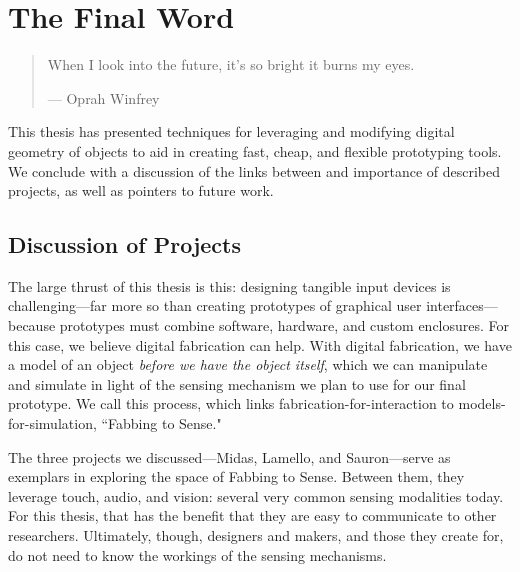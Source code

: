 \chapter{The Final Word}

\begin{quote}
When I look into the future, it's so bright it burns my eyes.

--- Oprah Winfrey
\end{quote}

This thesis has presented techniques for leveraging and modifying digital geometry of objects to aid in creating fast, cheap, and flexible prototyping tools. We conclude with a discussion of the links between and importance of described projects, as well as pointers to future work.



%

\section{Discussion of Projects}

The large thrust of this thesis is this: designing tangible input devices is challenging---far more so than creating prototypes of graphical user interfaces---because prototypes must combine software, hardware, and custom enclosures. For this case, we believe digital fabrication can help. With digital fabrication, we have a model of an object \emph{before we have the object itself}, which we can manipulate and simulate in light of the sensing mechanism we plan to use for our final prototype. We call this process, which links fabrication-for-interaction to models-for-simulation, ``Fabbing to Sense."

The three projects we discussed---Midas, Lamello, and Sauron---serve as exemplars in exploring the space of Fabbing to Sense. Between them, they leverage touch, audio, and vision: several very common sensing modalities today. For this thesis, that has the benefit that they are easy to communicate to other researchers. Ultimately, though, designers and makers, and those they create for, do not need to know the workings of the sensing mechanisms.

